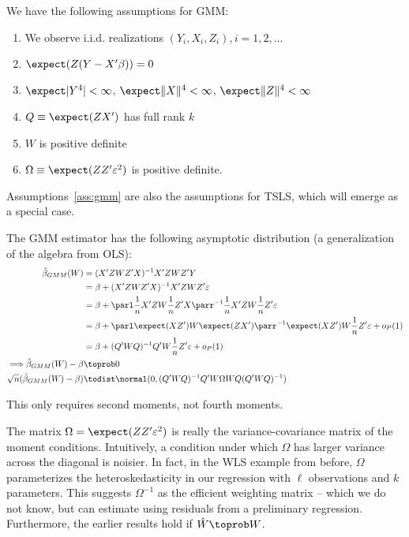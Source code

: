 \documentclass[10pt]{article}
\begin{document}
\begin{assumption}\label{ass:gmm}
	We have the following assumptions for GMM:
	\begin{enumerate}
		\item We observe i.i.d. realizations $(Y_i,X_i,Z_i), i = 1,2,\dots$
		\item $\expect(Z(Y - X'\beta)) = 0$
		\item $\expect |Y^4| < \infty$, $\expect \|X\|^4 < \infty$, $\expect \|Z\|^4 < \infty$
		\item $Q \equiv \expect (ZX')$ has full rank $k$
		\item $W$ is positive definite
		\item $\Omega \equiv \expect(ZZ'\varepsilon^2)$ is positive definite.
	\end{enumerate}
\end{assumption}
\begin{remark}
	Assumptions~\ref{ass:gmm} are also the assumptions for TSLS, which will emerge as a special case.
\end{remark}

The GMM estimator has the following asymptotic distribution (a generalization of the algebra from OLS):
\begin{align*}
	\hat{\beta}_{GMM}(W) &= (X'ZWZ'X)^{-1} X'ZWZ'Y \\ 
	&= \beta + (X'ZWZ'X)^{-1} X'ZWZ'\varepsilon \\ 
	&= \beta + \parl \frac{1}{n} X'ZW\frac{1}{n} Z'X\parr^{-1} \frac{1}{n}X'ZW\frac{1}{n} Z'\varepsilon \\
	&= \beta + \parl \expect (XZ') W \expect(ZX')\parr^{-1} \expect(XZ') W \frac{1}{n}Z'\varepsilon + o_P(1) \\
	&= \beta + (Q'WQ)^{-1}Q'W\frac{1}{n}Z'\varepsilon + o_P(1) \\
	\Longrightarrow \hat{\beta}_{GMM}(W) - \beta &\toprob 0 \\ 
	\sqrt{n}(\hat{\beta}_{GMM}(W) - \beta) &\todist \normal(0,(Q'WQ)^{-1}Q'W\Omega WQ(Q'WQ)^{-1})
\end{align*}
\begin{remark}
	This only requires second moments, not fourth moments.
\end{remark}

The matrix $\Omega = \expect(ZZ'\varepsilon^2)$ is really the variance-covariance matrix of the moment conditions. Intuitively, a condition under which $\Omega$ has larger variance across the diagonal is noisier. In fact, in the WLS example from before, $\Omega$ parameterizes the heteroskedasticity in our regression with $\ell$ observations and $k$ parameters. This suggests $\Omega^{-1}$ as the efficient weighting matrix -- which we do not know, but can estimate using residuals from a preliminary regression. Furthermore, the earlier results hold if $\hat{W} \toprob W$. 
\end{document}
